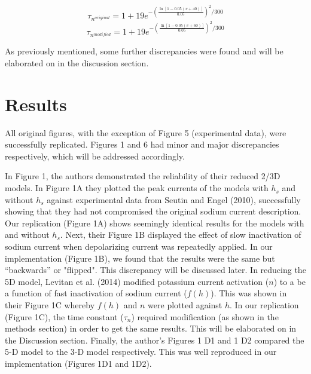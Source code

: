 \begin{center}
	$$\tau_{n^{original}} = 1 + 19 e^{- (\frac{{\ln[1 - 0.05 (v+40)]}}{0.05})^{2}/300}$$
	$$\tau_{n^{modified}} = 1 + 19 e^{- (\frac{{\ln[1 - 0.05 (v+60)]}}{0.05})^{2}/300}$$
\end{center}

As previously mentioned, some further discrepancies were found and will be elaborated on in the discussion section. 


\section{Results}

All original figures, with the exception of Figure 5 (experimental data), were successfully replicated. Figures 1 and 6 had minor and major discrepancies respectively, which will be addressed accordingly.

In Figure 1, the authors demonstrated the reliability of their reduced 2/3D models. In Figure 1A they plotted the peak currents of the models with $h_{s}$ and without $h_{s}$ against experimental data from Seutin and Engel (2010), successfully showing that they had not compromised the original sodium current description.  Our replication (Figure 1A) shows seemingly identical results for the models with and without $h_{s}$. Next, their Figure 1B displayed the effect of slow inactivation of sodium current when depolarizing current was repeatedly applied. In our implementation (Figure 1B), we found that the results were the same but “backwards” or "flipped". This discrepancy will be discussed later. In reducing the 5D model, Levitan et al. (2014) modified potassium current activation ($n$) to a be a function of fast inactivation of sodium current ($f(h)$). This was shown in their Figure 1C whereby $f(h)$ and $n$ were plotted against $h$. In our replication (Figure 1C), the time constant ($\tau_n$) required modification (as shown in the methods section) in order to get the same results. This will be elaborated on in the Discussion section. Finally, the author's Figures 1 D1 and 1 D2 compared the 5-D model to the 3-D model respectively. This was well reproduced in our implementation (Figures 1D1 and 1D2).\\ 

